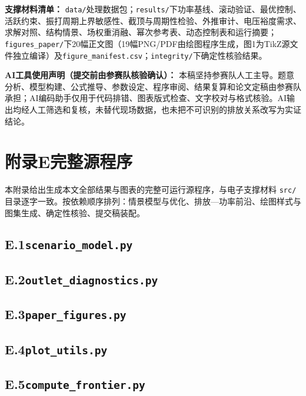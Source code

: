 \documentclass[UTF8,zihao=5,a4paper]{ctexart}
\begin{document}
\textbf{支撑材料清单：} \texttt{data/}处理数据包；\texttt{results/}下功率基线、滚动验证、最优控制、活跃约束、振打周期上界敏感性、截顶与周期性检验、外推审计、电压裕度需求、求解对照、结构情景、场权重消融、幂次参考表、动态控制表和运行摘要；\texttt{figures\_paper/}下20幅正文图（19幅PNG/PDF由绘图程序生成，图1为TikZ源文件独立编译）及\texttt{figure\_manifest.csv}；\texttt{integrity/}下确定性核验结果。

\textbf{AI工具使用声明（提交前由参赛队核验确认）：} 本稿坚持参赛队人工主导。题意分析、模型构建、公式推导、参数设定、程序审阅、结果复算和论文定稿由参赛队承担；AI编码助手仅用于代码排错、图表版式检查、文字校对与格式核验。AI输出均经人工筛选和复核，未替代现场数据，也未把不可识别的排放关系改写为实证结论。
\clearpage
\section*{附录E\quad 完整源程序}
本附录给出生成本文全部结果与图表的完整可运行源程序，与电子支撑材料 \texttt{src/} 目录逐字一致。按依赖顺序排列：情景模型与优化、排放—功率前沿、绘图样式与图集生成、确定性核验、提交稿装配。
\subsection*{E.1\quad \texttt{scenario\_model.py}}

\subsection*{E.2\quad \texttt{outlet\_diagnostics.py}}

\subsection*{E.3\quad \texttt{paper\_figures.py}}

\subsection*{E.4\quad \texttt{plot\_utils.py}}

\subsection*{E.5\quad \texttt{compute\_frontier.py}}

\end{document}
